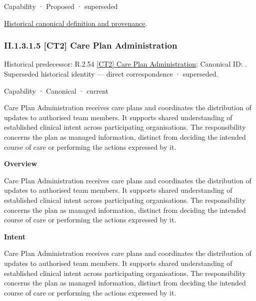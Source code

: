 \label{element:9f0f4379c1954524ba5e691d0c7d95ab}
{\small Capability · Proposed · superseded}\par
\href{../../../../continuum/strategy/capability/9f0f4379c1954524ba5e691d0c7d95ab.md}{Historical canonical definition and provenance}.\par
\subsubsection*{II.1.3.1.5 [CT2] Care Plan Administration}
\label{navigation:II.1.3.1.5}

{\small Historical predecessor: R.2.54 \hyperref[element:e31407cea7624632a8ed2dc53b09d726]{[CT2] Care Plan Administration}; Canonical ID: \texttt{}. Superseded historical identity — direct correspondence · superseded.}\par
\label{element:cf06eec5699f406fa30a00d2f76e3098}
{\small Capability · Canonical · current}\par

Care Plan Administration receives care plans and coordinates the distribution of updates to authorised team members. It supports shared understanding of established clinical intent across participating organisations. The responsibility concerns the plan as managed information, distinct from deciding the intended course of care or performing the actions expressed by it.



\textbf{Overview}



Care Plan Administration receives care plans and coordinates the distribution of updates to authorised team members. It supports shared understanding of established clinical intent across participating organisations. The responsibility concerns the plan as managed information, distinct from deciding the intended course of care or performing the actions expressed by it.



\textbf{Intent}



Care Plan Administration receives care plans and coordinates the distribution of updates to authorised team members. It supports shared understanding of established clinical intent across participating organisations. The responsibility concerns the plan as managed information, distinct from deciding the intended course of care or performing the actions expressed by it.



